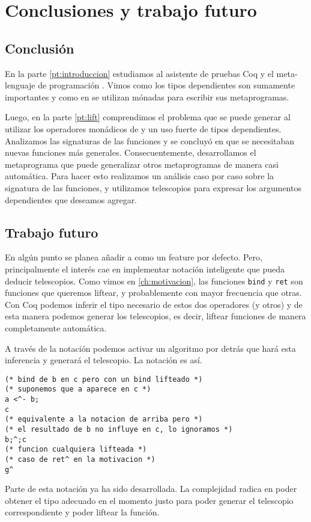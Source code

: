 \chapter{Conclusiones y trabajo futuro}\label{ch:conclusion}

\section{Conclusión}\label{sc:conclusion}

En la parte \ref{pt:introduccion} estudiamos al asistente de pruebas Coq y el meta-lenguaje de programación \mtac. Vimos como los tipos dependientes son sumamente importantes y como en \mtac se utilizan mónadas para escribir sus metaprogramas.

Luego, en la parte \ref{pt:lift} comprendimos el problema que se puede generar al utilizar los operadores monádicos de \mtac y un uso fuerte de tipos dependientes. Analizamos las signaturas de las funciones y se concluyó en que se necesitaban nuevas funciones más generales.
Consecuentemente, desarrollamos el metaprograma \lift que puede generalizar otros metaprogramas de manera casi automática. Para hacer esto realizamos un análisis caso por caso sobre la signatura de las funciones, y utilizamos telescopios para expresar los argumentos dependientes que deseamos agregar.

\section{Trabajo futuro}\label{sc:futuro}

En algún punto se planea añadir \lift a \mtac como un feature por defecto.
Pero, principalmente el interés cae en implementar notación inteligente que pueda deducir telescopios.
Como vimos en \ref{ch:motivacion}, las funciones \lstinline{bind} y \lstinline{ret} son funciones que queremos liftear, y probablemente con mayor frecuencia que otras.
Con Coq podemos inferir el tipo necesario de estos dos operadores (y otros) y de esta manera podemos generar los telescopios, es decir, liftear funciones de manera completamente automática.

A través de la notación podemos activar un algoritmo por detrás que hará esta inferencia y generará el telescopio.
La notación es así.

\begin{lstlisting}
(* bind de b en c pero con un bind lifteado *)
(* suponemos que a aparece en c *)
a <^- b;
c 
(* equivalente a la notacion de arriba pero *)
(* el resultado de b no influye en c, lo ignoramos *)
b;^;c
(* funcion cualquiera lifteada *)
(* caso de ret^ en la motivacion *)
g^ 
\end{lstlisting}

Parte de esta notación ya ha sido desarrollada. La complejidad radica en poder obtener el tipo adecuado en el momento justo para poder generar el telescopio correspondiente y poder liftear la función.